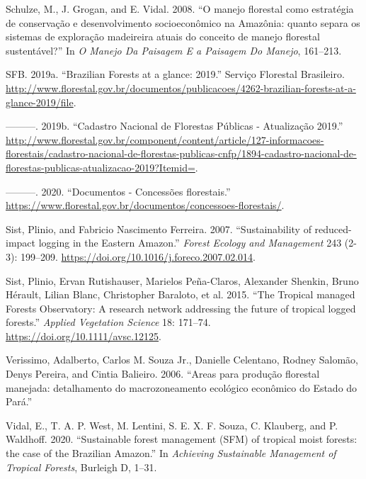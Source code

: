 \documentclass[
]{article}
\begin{document}
\leavevmode\hypertarget{ref-Schulze2008}{}%
Schulze, M., J. Grogan, and E. Vidal. 2008. ``O manejo florestal como estratégia de conservação e desenvolvimento socioeconômico na Amazônia: quanto separa os sistemas de exploração madeireira atuais do conceito de manejo florestal sustentável?'' In \emph{O Manejo Da Paisagem E a Paisagem Do Manejo}, 161--213.

\leavevmode\hypertarget{ref-SFB2019}{}%
SFB. 2019a. ``Brazilian Forests at a glance: 2019.'' Serviço Florestal Brasileiro. \url{http://www.florestal.gov.br/documentos/publicacoes/4262-brazilian-forests-at-a-glance-2019/file}.

\leavevmode\hypertarget{ref-SFB2019a}{}%
---------. 2019b. ``Cadastro Nacional de Florestas Públicas - Atualização 2019.'' \url{http://www.florestal.gov.br/component/content/article/127-informacoes-florestais/cadastro-nacional-de-florestas-publicas-cnfp/1894-cadastro-nacional-de-florestas-publicas-atualizacao-2019?Itemid=}.

\leavevmode\hypertarget{ref-SFB2020}{}%
---------. 2020. ``Documentos - Concessões florestais.'' \url{https://www.florestal.gov.br/documentos/concessoes-florestais/}.

\leavevmode\hypertarget{ref-Sist2007}{}%
Sist, Plinio, and Fabricio Nascimento Ferreira. 2007. ``Sustainability of reduced-impact logging in the Eastern Amazon.'' \emph{Forest Ecology and Management} 243 (2-3): 199--209. \url{https://doi.org/10.1016/j.foreco.2007.02.014}.

\leavevmode\hypertarget{ref-Sist2015}{}%
Sist, Plinio, Ervan Rutishauser, Marielos Peña-Claros, Alexander Shenkin, Bruno Hérault, Lilian Blanc, Christopher Baraloto, et al. 2015. ``The Tropical managed Forests Observatory: A research network addressing the future of tropical logged forests.'' \emph{Applied Vegetation Science} 18: 171--74. \url{https://doi.org/10.1111/avsc.12125}.

\leavevmode\hypertarget{ref-Verissimo2006}{}%
Verissimo, Adalberto, Carlos M. Souza Jr., Danielle Celentano, Rodney Salomão, Denys Pereira, and Cintia Balieiro. 2006. ``Areas para produção florestal manejada: detalhamento do macrozoneamento ecológico econômico do Estado do Pará.''

\leavevmode\hypertarget{ref-Vidal2020}{}%
Vidal, E., T. A. P. West, M. Lentini, S. E. X. F. Souza, C. Klauberg, and P. Waldhoff. 2020. ``Sustainable forest management (SFM) of tropical moist forests: the case of the Brazilian Amazon.'' In \emph{Achieving Sustainable Management of Tropical Forests}, Burleigh D, 1--31.
\end{document}
